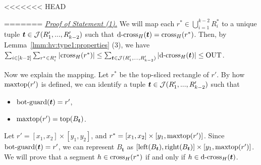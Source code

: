 <<<<<<< HEAD



=======
\noindent \underline{\em Proof of Statement (1).}
We will map each $r^*\in \bigcup_{i = 1}^{k-2} R_i^*$ to a unique tuple $\textrm{\boldmath${t}$}\in \mathcal{J}(R_1',...,R_{k-2}')$ such that $\mathrm{d\text{-}cross}_H(\textrm{\boldmath${t}$}) = \mathrm{cross}_H(r^*)$. Then, by Lemma~\ref{lmm:hv:type1:properties} (3), we have $\sum_{i\in[k-2]}\sum_{r^*\in R_i^*} |\mathrm{cross}_H(r^*)| \leq \sum_{\textrm{\boldmath${t}$}\in \mathcal{J}(R_1',...,R_{k-2}')}|\mathrm{d\text{-}cross}_H(\textrm{\boldmath${t}$})|\leq \mathrm{OUT}$.

\vgap 

Now we explain the mapping. Let $r^*$ be the top-sliced rectangle of $r'$. By how $\mathrm{maxtop}(r')$ is defined, we can identify a tuple $\textrm{\boldmath${t}$}\in \mathcal{J}(R_1',...,R_{k-2}')$ such that 
\begin{itemize}
    \item $\mathrm{bot\text{-}guard}(\textrm{\boldmath${t}$}) = r'$,
    \item $\mathrm{maxtop}(r') = \mathrm{top}(B_{\textrm{\boldmath${t}$}})$.
\end{itemize}
Let $r' = [x_1,x_2]\times [y_1,y_2]$, and $r^* = [x_1,x_2]\times [y_1,\mathrm{maxtop}(r')]$. Since $\mathrm{bot\text{-}guard}(\textrm{\boldmath${t}$}) = r'$, we can represent $B_{\bm{t}}$ as $[\mathrm{left}(B_{\textrm{\boldmath${t}$}}), \mathrm{right}(B_{\textrm{\boldmath${t}$}})]\times [y_1, \mathrm{maxtop}(r')]$.
We will prove that a segment $h\in \mathrm{cross}_H(r^*)$ if and only if $h\in \mathrm{d\text{-}cross}_H(\textrm{\boldmath${t}$})$. 

